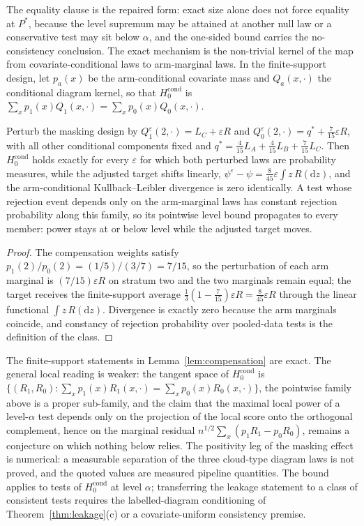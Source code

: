 The equality clause is the repaired form: exact size alone does not force equality at $P^\ast$, because the level supremum may be attained at another null law or a conservative test may sit below $\alpha$, and the one-sided bound carries the no-consistency conclusion. The exact mechanism is the non-trivial kernel of the map from covariate-conditional laws to arm-marginal laws. In the finite-support design, let $p_a(x)$ be the arm-conditional covariate mass and $Q_a(x,\cdot)$ the conditional diagram kernel, so that $H_0^{\mathrm{cond}}$ is $\sum_x p_1(x)Q_1(x,\cdot)=\sum_x p_0(x)Q_0(x,\cdot)$.

\begin{lemma}
\label{lem:compensation}
Perturb the masking design by $Q_1^\varepsilon(2,\cdot)=L_C+\varepsilon R$ and $Q_0^\varepsilon(2,\cdot)=q^\ast+\tfrac{7}{15}\varepsilon R$, with all other conditional components fixed and $q^\ast=\tfrac{4}{15}L_A+\tfrac{4}{15}L_B+\tfrac{7}{15}L_C$. Then $H_0^{\mathrm{cond}}$ holds exactly for every $\varepsilon$ for which both perturbed laws are probability measures, while the adjusted target shifts linearly, $\psi^\varepsilon-\psi=\tfrac{8}{45}\varepsilon\int z\,R(\mathrm dz)$, and the arm-conditional Kullback--Leibler divergence is zero identically. A test whose rejection event depends only on the arm-marginal laws has constant rejection probability along this family, so its pointwise level bound propagates to every member: power stays at or below level while the adjusted target moves.
\end{lemma}

\begin{proof}
The compensation weights satisfy $p_1(2)/p_0(2)=(1/5)/(3/7)=7/15$, so the perturbation of each arm marginal is $(7/15)\varepsilon R$ on stratum two and the two marginals remain equal; the target receives the finite-support average $\tfrac13(1-\tfrac{7}{15})\varepsilon R=\tfrac{8}{45}\varepsilon R$ through the linear functional $\int z\,R(\mathrm dz)$. Divergence is exactly zero because the arm marginals coincide, and constancy of rejection probability over pooled-data tests is the definition of the class.
\end{proof}

The finite-support statements in Lemma~\ref{lem:compensation} are exact. The general local reading is weaker: the tangent space of $H_0^{\mathrm{cond}}$ is $\{(R_1,R_0):\sum_x p_1(x)R_1(x,\cdot)=\sum_x p_0(x)R_0(x,\cdot)\}$, the pointwise family above is a proper sub-family, and the claim that the maximal local power of a level-$\alpha$ test depends only on the projection of the local score onto the orthogonal complement, hence on the marginal residual $n^{1/2}\sum_x(p_1R_1-p_0R_0)$, remains a conjecture on which nothing below relies. The positivity leg of the masking effect is numerical: a measurable separation of the three cloud-type diagram laws is not proved, and the quoted values are measured pipeline quantities. The bound applies to tests of $H_0^{\mathrm{cond}}$ at level $\alpha$; transferring the leakage statement to a class of consistent tests requires the labelled-diagram conditioning of Theorem~\ref{thm:leakage}(c) or a covariate-uniform consistency premise.

